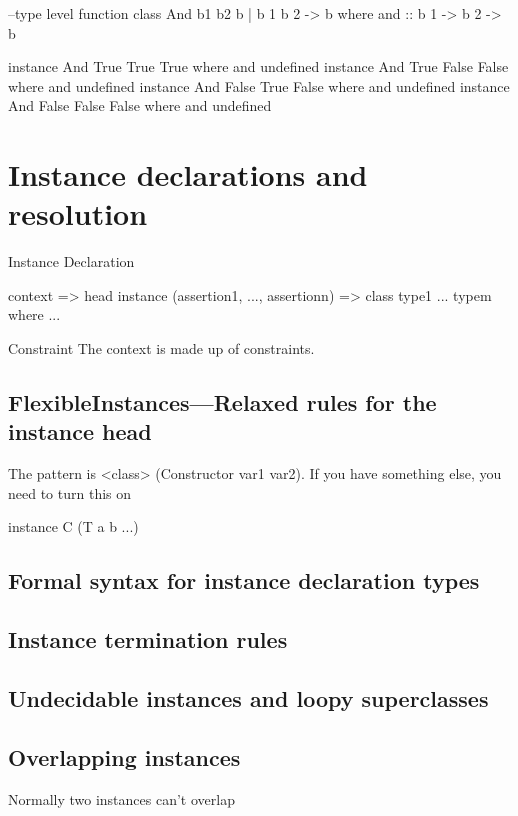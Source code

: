 \documentclass[openany, 12pt]{book}
\begin{document}
\begin{haskell}{}
--type level function
class And b1 b2 b | b 1 b 2 -> b where
    and :: b 1 -> b 2 -> b

instance And True True True    where and undefined
instance And True False False  where and undefined
instance And False True False  where and undefined
instance And False False False where and undefined
\end{haskell}

\chapter{Instance declarations and resolution}
\begin{definition}{Instance Declaration}{}
	\begin{haskell}{}
                               context => head
instance (assertion1, ..., assertionn) => class type1 ... typem where ...
    \end{haskell}
\end{definition}

\begin{definition}{Constraint}{}
	The context is made up of constraints.
\end{definition}

\section{FlexibleInstances---Relaxed rules for the instance head}
The pattern  is <class> (Constructor var1 var2). If you have something else, you
need to turn this on

\begin{haskell}{}
instance C (T a b ...)
\end{haskell}

\section{Formal syntax for instance declaration types}
\section{Instance termination rules}
\section{Undecidable instances and loopy superclasses}
\section{Overlapping instances}
Normally two instances can't overlap
\end{document}

